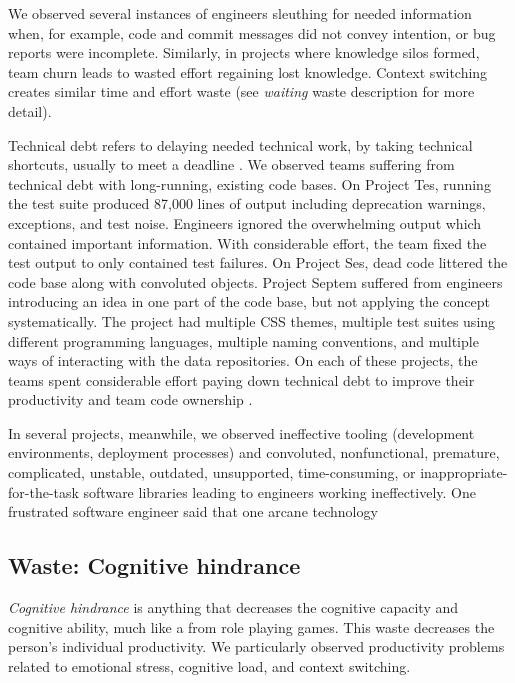We observed several instances of engineers sleuthing for needed information when, for example, code and commit messages did not convey intention, or bug reports were incomplete. Similarly, in projects where knowledge silos formed, team churn leads to wasted effort regaining lost knowledge. Context switching creates similar time and effort waste (see \textit{waiting} waste description for more detail). 
 
Technical debt refers to delaying needed technical work, by taking technical shortcuts, usually to meet a deadline \cite{McConnellTechnicalDebt}. We observed teams suffering from technical debt with long-running, existing code bases. On Project Tes, running the test suite produced 87,000 lines of output including deprecation warnings, exceptions, and test noise. Engineers ignored the overwhelming output which contained important information. With considerable effort, the team fixed the test output to only contained test failures. On Project Ses, dead code littered the code base along with convoluted objects. Project Septem suffered from engineers introducing an idea in one part of the code base, but not applying the concept systematically. The project had multiple CSS themes, multiple test suites using different programming languages, multiple naming conventions, and multiple ways of interacting with the data repositories. On each of these projects, the teams spent considerable effort paying down technical debt to improve their productivity and team code ownership \cite{SedanoTeamCodeOwnership}.  

In several projects, meanwhile, we observed ineffective tooling (development environments, deployment processes) and convoluted, nonfunctional, premature, complicated, unstable, outdated, unsupported, time-consuming, or inappropriate-for-the-task software libraries leading to engineers working ineffectively. One frustrated software engineer said that one arcane technology 
\subsection{Waste: Cognitive hindrance}
\textit{Cognitive hindrance} is anything that decreases the cognitive capacity and cognitive ability, much like a  from role playing games. This waste decreases the person's individual productivity. We particularly observed productivity problems related to emotional stress, cognitive load, and context switching.

